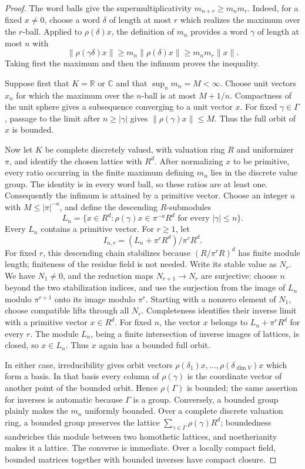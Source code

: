 \documentclass[11pt,reqno]{amsart}
\theoremstyle{definition}
\theoremstyle{remark}
\newcommand{\R}{\mathbb R}
\newcommand{\C}{\mathbb C}
\begin{document}
\begin{proof}
The word balls give the supermultiplicativity
\(m_{n+r}\ge m_nm_r\).  Indeed, for a fixed \(x\ne0\), choose a word
\(\delta\) of length at most \(r\) which realizes the maximum over the
\(r\)-ball.  Applied to \(\rho(\delta)x\), the definition of \(m_n\)
provides a word \(\gamma\) of length at most \(n\) with
\[
 \|\rho(\gamma\delta)x\|
 \ge m_n\|\rho(\delta)x\|
 \ge m_nm_r\|x\|.
\]
Taking first the maximum and then the infimum proves the inequality.

Suppose first that \(K=\R\) or \(\C\) and that
\(\sup_n m_n=M<\infty\).  Choose unit vectors \(x_n\) for which the maximum
over the \(n\)-ball is at most \(M+1/n\).  Compactness of the unit sphere
gives a subsequence converging to a unit vector \(x\).  For fixed
\(\gamma\in\Gamma\), passage to the limit after \(n\ge|\gamma|\) gives
\(\|\rho(\gamma)x\|\le M\).  Thus the full orbit of \(x\) is bounded.

Now let \(K\) be complete discretely valued, with valuation ring \(R\) and
uniformizer \(\pi\), and identify the chosen lattice with \(R^d\).  After
normalizing \(x\) to be primitive, every ratio occurring in the finite
maximum defining \(m_n\) lies in the discrete value group.  The identity is
in every word ball, so these ratios are at least one.  Consequently the
infimum is attained by a primitive vector.  Choose an integer \(a\) with
\(M\le|\pi|^{-a}\), and define the descending \(R\)-submodules
\[
 L_n=\{x\in R^d:\rho(\gamma)x\in\pi^{-a}R^d
                     \text{ for every }|\gamma|\le n\}.
\]
Every \(L_n\) contains a primitive vector.  For \(r\ge1\), let
\[
 I_{n,r}=(L_n+\pi^rR^d)/\pi^rR^d.
\]
For fixed \(r\), this descending chain stabilizes because
\((R/\pi^rR)^d\) has finite module length; finiteness of the residue field is
not needed.  Write its stable value as \(N_r\).  We have \(N_1\ne0\), and
the reduction maps \(N_{r+1}\to N_r\) are surjective: choose \(n\) beyond
the two stabilization indices, and use the surjection from the image of
\(L_n\) modulo \(\pi^{r+1}\) onto its image modulo \(\pi^r\).  Starting
with a nonzero element of \(N_1\), choose compatible lifts through all
\(N_r\).  Completeness identifies their inverse limit with a primitive
vector \(x\in R^d\).  For fixed \(n\), the vector \(x\) belongs to
\(L_n+\pi^rR^d\) for every \(r\).  The module \(L_n\), being a finite
intersection of inverse images of lattices, is closed, so \(x\in L_n\).
Thus \(x\) again has a bounded full orbit.

In either case, irreducibility gives orbit vectors
\(\rho(\delta_1)x,\ldots,\rho(\delta_{\dim V})x\) which form a basis.
In that basis every column of \(\rho(\gamma)\) is the coordinate vector of
another point of the bounded orbit.  Hence \(\rho(\Gamma)\) is bounded; the
same assertion for inverses is automatic because \(\Gamma\) is a group.
Conversely, a bounded group plainly makes the \(m_n\) uniformly bounded.
Over a complete discrete valuation ring, a bounded group preserves the
lattice \(\sum_{\gamma\in\Gamma}\rho(\gamma)R^d\); boundedness sandwiches
this module between two homothetic lattices, and noetherianity makes it a
lattice.  The converse is immediate.  Over a locally compact field, bounded
matrices together with bounded inverses have compact closure.


\end{proof}
\end{document}
